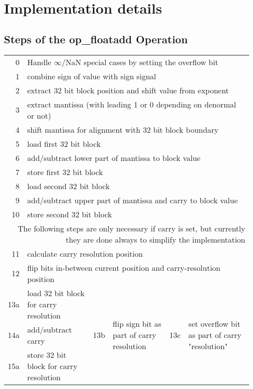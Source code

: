 \section{Implementation details}
\subsection{Steps of the op\_floatadd Operation}

\renewcommand\tabline[2]{#1 & \multicolumn{5}{p{0.8\textwidth}|}{#2}\\}
\begin{center}
\begin{tabularx}{\textwidth}{|r|X|r|X|r|X|}
\hline
\tabline {  0} {Handle $\infty$/NaN special cases by setting the overflow bit}
\tabline {  1} {combine sign of value with sign signal}
\tabline {  2} {extract 32 bit block position and shift value from exponent}
\tabline {  3} {extract mantissa (with leading 1 or 0 depending on denormal or not)}
\tabline {  4} {shift mantissa for alignment with 32 bit block boundary}
\tabline {  5} {load first 32 bit block}
\tabline {  6} {add/subtract lower part of mantissa to block value}
\tabline {  7} {store first 32 bit block}
\tabline {  8} {load second 32 bit block}
\tabline {  9} {add/subtract upper part of mantissa and carry to block value}
\tabline { 10} {store second 32 bit block}
\hline\hline
\multicolumn{6}{|p{0.75\textwidth}|}{
    The following steps are only necessary if carry is set,
    but currently they are done always to simplify the implementation}\\
\hline\hline
\tabline { 11} {calculate carry resolution position}
\tabline { 12} {flip bits in-between current position and carry-resolution position}
\hline
13a & load 32 bit block for carry resolution &
\multirow{3}{*}{13b} & \multirow{3}{0.25\textwidth}{flip sign bit as part of carry resolution} &
\multirow{3}{*}{13c} & \multirow{3}{0.25\textwidth}{set overflow bit as part of carry "resolution"}\\
14a & add/subtract carry & & & &\\
15a & store 32 bit block for carry resolution & & & &\\
\hline
\end{tabularx}
\end{center}

